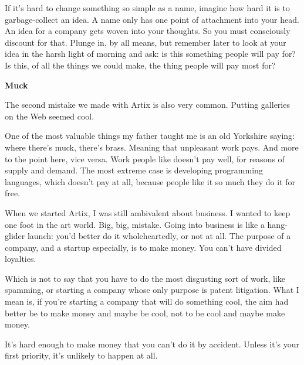 If
                    it's hard to change something so simple as a name, imagine
                    how hard it is to garbage-collect an idea. A name only has
                    one point of attachment into your head. An idea for a
                    company gets woven into your thoughts. So you must
                    consciously discount for that. Plunge in, by all means, but
                    remember later to look at your idea in the harsh light of
                    morning and ask: is this something people will pay for? Is
                    this, of all the things we could make, the thing people will
                    pay most for?

\textbf{Muck}

The second
                    mistake we made with Artix is also very common. Putting
                    galleries on the Web seemed cool.

One of the most
                    valuable things my father taught me is an old Yorkshire
                    saying: where there's muck, there's brass. Meaning that
                    unpleasant work pays. And more to the point here, vice
                    versa. Work people like doesn't pay well, for reasons of
                    supply and demand. The most extreme case is developing
                    programming languages, which doesn't pay at all, because
                    people like it so much they do it for free.

When
                    we started Artix, I was still ambivalent about business. I
                    wanted to keep one foot in the art world. Big, big, mistake.
                    Going into business is like a hang-glider launch: you'd
                    better do it wholeheartedly, or not at all. The purpose of a
                    company, and a startup especially, is to make money. You
                    can't have divided loyalties.

Which is not to say
                    that you have to do the most disgusting sort of work, like
                    spamming, or starting a company whose only purpose is patent
                    litigation. What I mean is, if you're starting a company
                    that will do something cool, the aim had better be to make
                    money and maybe be cool, not to be cool and maybe make
                    money.

It's hard enough to make money that you
                    can't do it by accident. Unless it's your first priority,
                    it's unlikely to happen at all.

